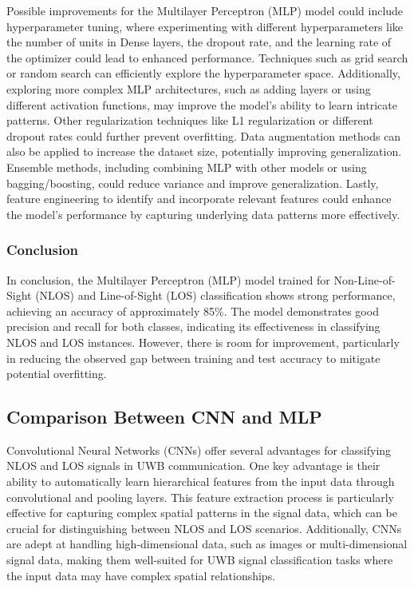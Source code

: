 Possible improvements for the Multilayer Perceptron (MLP) model could include hyperparameter tuning, where experimenting with different hyperparameters like the number of units in Dense layers, the dropout rate, and the learning rate of the optimizer could lead to enhanced performance. Techniques such as grid search or random search can efficiently explore the hyperparameter space. Additionally, exploring more complex MLP architectures, such as adding layers or using different activation functions, may improve the model's ability to learn intricate patterns. Other regularization techniques like L1 regularization or different dropout rates could further prevent overfitting. Data augmentation methods can also be applied to increase the dataset size, potentially improving generalization. Ensemble methods, including combining MLP with other models or using bagging/boosting, could reduce variance and improve generalization. Lastly, feature engineering to identify and incorporate relevant features could enhance the model's performance by capturing underlying data patterns more effectively.

\subsubsection{Conclusion}

In conclusion, the Multilayer Perceptron (MLP) model trained for Non-Line-of-Sight (NLOS) and Line-of-Sight (LOS) classification shows strong performance, achieving an accuracy of approximately 85\%. The model demonstrates good precision and recall for both classes, indicating its effectiveness in classifying NLOS and LOS instances. However, there is room for improvement, particularly in reducing the observed gap between training and test accuracy to mitigate potential overfitting.

\subsection{Comparison Between CNN and MLP}\label{cnn_vs_mlp}


Convolutional Neural Networks (CNNs) offer several advantages for classifying NLOS and LOS signals in UWB communication. One key advantage is their ability to automatically learn hierarchical features from the input data through convolutional and pooling layers. This feature extraction process is particularly effective for capturing complex spatial patterns in the signal data, which can be crucial for distinguishing between NLOS and LOS scenarios. Additionally, CNNs are adept at handling high-dimensional data, such as images or multi-dimensional signal data, making them well-suited for UWB signal classification tasks where the input data may have complex spatial relationships.

